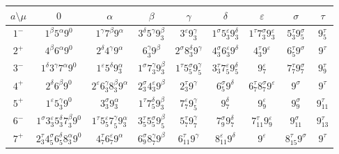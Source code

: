 \documentclass[a4paper,12pt]{report}
\begin{document}
\begin{center}
\begin{tabular}{|c|c|c|c|c|c|c|c|c|}\hline
 $ a\setminus\mu$  &  $ 0$  &  $ \alpha$ &  $ \beta$ &  $ \gamma$& $\delta$ & $\varepsilon$ & $\sigma$ & $\tau$ \\ \hline
 $1^{-}$ & $1^{\beta}5^{\alpha}9^{0}$  &  $1^{\gamma}7^{\beta}9^{\alpha}$ &  $3^{\delta}5^{\gamma}9_{3}^{\beta}$ &  $3^{\varepsilon}9_{3}^{\gamma}$ & $1^{\sigma}5_{3}^{\varepsilon}9_{3}^{\delta}$ & $1^{\tau}7_{3}^{\sigma}9_{3}^{\varepsilon}$ & $5_{3}^{\tau}9_{5}^{\sigma}$ & $9_{5}^{\tau}$\\ \hline
 $2^{+}$ & $4^{\beta}6^{\alpha}9^{0}$  & $2^{\delta}4^{\gamma}9^{\alpha}$ & $6_{3}^{\gamma}9^{\beta}$ & $2^{\sigma}8_{3}^{\delta}9^{\gamma}$ &  $4_{3}^{\sigma}6_{3}^{\varepsilon}9^{\delta}$ & $4_{3}^{\tau}9^{\varepsilon}$ & $6_{5}^{\tau}9^{\sigma}$ & $9^{\tau}$\\ \hline
 $3^{-}$ & $1^{\delta}3^{\gamma}7^{\alpha}9^{0}$   & $1^{\varepsilon}5^{\delta}9_{3}^{\alpha}$ & $1^{\sigma}7_{3}^{\gamma}9_{3}^{\beta}$ & $1^{\tau}5_{5}^{\sigma}9_{5}^{\gamma}$& $3_{3}^{\tau}7_{5}^{\varepsilon}9_{5}^{\delta}$ & $9_{7}^{\varepsilon}$ & $7_{7}^{\tau}9_{7}^{\sigma}$ & $9_{9}^{\tau}$\\ \hline
 $4^{+}$ & $2^{\delta}6^{\beta}9^{0}$ &  $2^{\varepsilon}6_{3}^{\gamma}8_{3}^{\beta}9^{\alpha}$ & $2_{3}^{\sigma}4_{3}^{\varepsilon}9^{\beta}$ & $2_{3}^{\tau}9^{\gamma}$ & $6_{5}^{\sigma}9^{\delta}$ & $6_{7}^{\tau}8_{7}^{\sigma}9^{\varepsilon}$ & $9^{\sigma}$ & $9^{\tau}$\\ \hline
 $5^{+}$ & $1^{\varepsilon}5_{3}^{\gamma}9^{0}$ &  $3_{3}^{\sigma}9_{3}^{\alpha}$ & $1^{\tau}7_{5}^{\delta}9_{3}^{\beta}$ & $7_{7}^{\varepsilon}9_{5}^{\gamma}$ & $9_{7}^{\delta}$ & $9_{9}^{\varepsilon}$ & $9_{9}^{\sigma}$ & $9_{11}^{\tau}$\\ \hline
 $6^{-}$ & $1^{\sigma}3_{3}^{\varepsilon}5_{3}^{\delta}7_{3}^{\beta}9^{0}$ & $1^{\tau}5_{5}^{\varepsilon}7_{5}^{\gamma}9_{3}^{\alpha}$ & $3_{5}^{\tau}5_{5}^{\sigma}9_{5}^{\beta}$ & $5_{7}^{\tau}9_{7}^{\gamma}$ & $7_{9}^{\sigma}9_{7}^{\delta}$ & $7_{11}^{\tau}9_{9}^{\varepsilon}$ & $9_{11}^{\sigma}$ & $9_{13}^{\tau}$\\ \hline
 $7^{+}$ & $2_{3}^{\tau}4_{5}^{\sigma}6_{5}^{\delta}8_{3}^{\alpha}9^{0}$  & $4_{7}^{\tau}6_{7}^{\varepsilon}9^{\alpha}$ & $6_{9}^{\sigma}8_{7}^{\gamma}9^{\beta}$ & $6_{11}^{\tau}9^{\gamma}$ & $8_{11}^{\varepsilon}9^{\delta}$ & $9^{\varepsilon}$ & $8_{15}^{\tau}9^{\sigma}$ & $9^{\tau}$\\ \hline

  \end{tabular}
\end{center}
\end{document}
